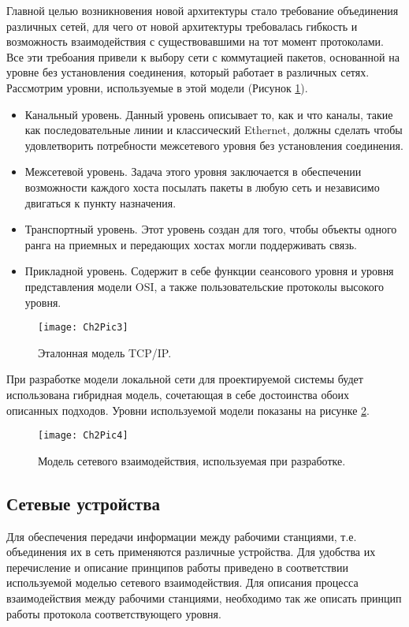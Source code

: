     Главной целью возникновения новой архитектуры стало требование объединения различных сетей, для чего от новой архитектуры требовалась гибкость и возможность взаимодействия с существовавшими на тот момент протоколами. Все эти требоания привели к выбору сети с коммутацией пакетов, основанной на уровне без установления соединения, который работает в различных сетях. Рассмотрим уровни, используемые в этой модели (Рисунок \ref{Pic3}).

    \begin{itemize}
        \item Канальный уровень. Данный уровень описывает то, как и что каналы, такие как последовательные линии и классический Ethernet, должны сделать чтобы удовлетворить потребности межсетевого уровня без установления соединения.
        \item Межсетевой уровень. Задача этого уровня заключается в обеспечении возможности каждого хоста посылать пакеты в любую сеть и независимо двигаться к пункту назначения.
        \item Транспортный уровень. Этот уровень создан для того, чтобы объекты одного ранга на приемных и передающих хостах могли поддерживать связь.
        \item Прикладной уровень. Содержит в себе функции сеансового уровня и уровня представления модели OSI, а также пользовательские протоколы высокого уровня.
    \end{itemize}

    \begin{figure}\center
        \texttt{[image: Ch2Pic3]}
        \caption{Эталонная модель TCP/IP.} \label{Pic3}
    \end{figure}

    При разработке модели локальной сети для проектируемой системы будет использована гибридная модель, сочетающая в себе достоинства обоих описанных подходов. Уровни используемой модели показаны на рисунке \ref{Pic4}.

    \begin{figure}\center
        \texttt{[image: Ch2Pic4]}
        \caption{Модель сетевого взаимодействия, используемая при разработке.} \label{Pic4}
    \end{figure}

    \subsection{Сетевые устройства }

    Для обеспечения передачи информации между рабочими станциями, т.е. объединения их в сеть применяются различные устройства. Для удобства их перечисление и описание принципов работы приведено в соответствии используемой моделью сетевого взаимодействия. Для описания процесса взаимодействия между рабочими станциями, необходимо так же описать принцип работы протокола соответствующего уровня.

